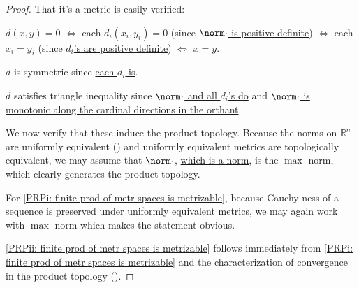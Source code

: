 	\begin{proof}
		That it's a metric is easily verified:
		\begin{prooflist}
			\item $d(x, y) = 0$ $\iff$ each $d_i(x_i, y_i) = 0$ (since \uline{$\norm\cdot$ is positive definite}) $\iff$ each $x_i = y_i$ (since \uline{$d_i$'s are positive definite}) $\iff$ $x = y$.
			
			\item $d$ is symmetric since \uline{each $d_i$ is}.
			
			\item $d$ satisfies triangle inequality since \uline{$\norm\cdot$ and all $d_i$'s do} and \uline{$\norm\cdot$ is monotonic along the cardinal directions in the orthant}.
		\end{prooflist}
		
		We now verify that these induce the product topology. Because the norms on $\mathbb R^n$ are uniformly equivalent () and uniformly equivalent metrics are topologically equivalent, we may assume \wlogg that $\norm\cdot$, \uline{which is a norm}, is the $\max$-norm, which clearly generates the product topology.
		
		For \ref{PRPi: finite prod of metr spaces is metrizable}, because Cauchy-ness of a sequence is preserved under uniformly equivalent metrics, we may again work with $\max$-norm which makes the statement obvious.
		
		\ref{PRPii: finite prod of metr spaces is metrizable} follows immediately from \ref{PRPi: finite prod of metr spaces is metrizable} and the characterization of convergence in the product topology ().
	\end{proof}
	
